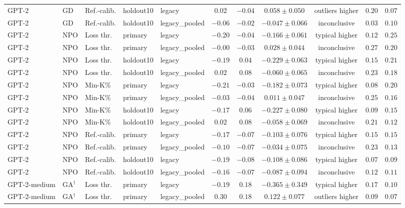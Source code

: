 \begin{table}[t]
\begin{tabular*}{\textwidth}{@{\extracolsep{\fill}}lllllcccccc@{}}
GPT-2 & GD & Ref.-calib. & holdout10 & legacy & $0.02$ & $-0.04$ & $0.058 \pm 0.050$ & outliers higher & $0.20$ & $0.07$ \\
GPT-2 & GD & Ref.-calib. & holdout10 & legacy\_pooled & $-0.06$ & $-0.02$ & $-0.047 \pm 0.066$ & inconclusive & $0.03$ & $0.10$ \\
GPT-2 & NPO & Loss thr. & primary & legacy & $-0.20$ & $-0.04$ & $-0.166 \pm 0.061$ & typical higher & $0.12$ & $0.25$ \\
GPT-2 & NPO & Loss thr. & primary & legacy\_pooled & $-0.00$ & $-0.03$ & $0.028 \pm 0.044$ & inconclusive & $0.27$ & $0.20$ \\
GPT-2 & NPO & Loss thr. & holdout10 & legacy & $-0.19$ & $0.04$ & $-0.229 \pm 0.063$ & typical higher & $0.15$ & $0.21$ \\
GPT-2 & NPO & Loss thr. & holdout10 & legacy\_pooled & $0.02$ & $0.08$ & $-0.060 \pm 0.065$ & inconclusive & $0.23$ & $0.18$ \\
GPT-2 & NPO & Min-K\% & primary & legacy & $-0.21$ & $-0.03$ & $-0.182 \pm 0.073$ & typical higher & $0.08$ & $0.20$ \\
GPT-2 & NPO & Min-K\% & primary & legacy\_pooled & $-0.03$ & $-0.04$ & $0.011 \pm 0.047$ & inconclusive & $0.25$ & $0.16$ \\
GPT-2 & NPO & Min-K\% & holdout10 & legacy & $-0.17$ & $0.06$ & $-0.227 \pm 0.080$ & typical higher & $0.09$ & $0.15$ \\
GPT-2 & NPO & Min-K\% & holdout10 & legacy\_pooled & $0.02$ & $0.08$ & $-0.058 \pm 0.069$ & inconclusive & $0.21$ & $0.12$ \\
GPT-2 & NPO & Ref.-calib. & primary & legacy & $-0.17$ & $-0.07$ & $-0.103 \pm 0.076$ & typical higher & $0.15$ & $0.15$ \\
GPT-2 & NPO & Ref.-calib. & primary & legacy\_pooled & $-0.10$ & $-0.07$ & $-0.034 \pm 0.075$ & inconclusive & $0.23$ & $0.13$ \\
GPT-2 & NPO & Ref.-calib. & holdout10 & legacy & $-0.19$ & $-0.08$ & $-0.108 \pm 0.086$ & typical higher & $0.07$ & $0.09$ \\
GPT-2 & NPO & Ref.-calib. & holdout10 & legacy\_pooled & $-0.16$ & $-0.07$ & $-0.087 \pm 0.094$ & inconclusive & $0.12$ & $0.11$ \\
GPT-2-medium & GA$^{\dagger}$ & Loss thr. & primary & legacy & $-0.19$ & $0.18$ & $-0.365 \pm 0.349$ & typical higher & $0.17$ & $0.10$ \\
GPT-2-medium & GA$^{\dagger}$ & Loss thr. & primary & legacy\_pooled & $0.30$ & $0.18$ & $0.122 \pm 0.077$ & outliers higher & $0.09$ & $0.07$ \\

\end{tabular*}
\end{table}
